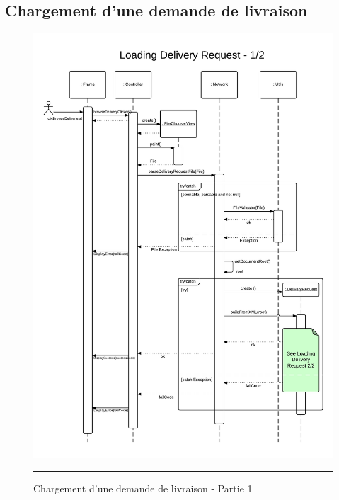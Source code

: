 \subsection{Chargement d'une demande de livraison}
\begin{figure}[H]
	\centering
		\includegraphics[width=\textwidth,height=\textheight,keepaspectratio]{Figures/chargement1}
		\rule{35em}{0.5pt}
	\caption[Chargement d'une demande de livraison - Partie 1]{Chargement d'une demande de livraison - Partie 1}
\end{figure}
\clearpage
